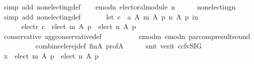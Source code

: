 \begin{isabellebody}
\ {\isacharparenleft}{\kern0pt}simp\ add{\isacharcolon}{\kern0pt}\ non{\isacharunderscore}{\kern0pt}electing{\isacharunderscore}{\kern0pt}def{\isacharparenright}{\kern0pt}\isanewline
\ \ \isamarkupfalse%
\ emod{\isacharunderscore}{\kern0pt}n{\isacharcolon}{\kern0pt}\ {\isachardoublequoteopen}electoral{\isacharunderscore}{\kern0pt}module\ n{\isachardoublequoteclose}\isanewline
\ \ \ \ \isamarkupfalse%
\ non{\isacharunderscore}{\kern0pt}electing{\isacharunderscore}{\kern0pt}n\isanewline
\ \ \ \ \isamarkupfalse%
\ {\isacharparenleft}{\kern0pt}simp\ add{\isacharcolon}{\kern0pt}\ non{\isacharunderscore}{\kern0pt}electing{\isacharunderscore}{\kern0pt}def{\isacharparenright}{\kern0pt}\isanewline
\ \ \isamarkupfalse%
\isanewline
\ \ \ \ {\isachardoublequoteopen}let\ c\ {\isacharequal}{\kern0pt}\ {\isacharparenleft}{\kern0pt}a\ A\ {\isacharparenleft}{\kern0pt}m\ A\ p{\isacharparenright}{\kern0pt}\ {\isacharparenleft}{\kern0pt}n\ A\ p{\isacharparenright}{\kern0pt}{\isacharparenright}{\kern0pt}\ in\isanewline
\ \ \ \ \ \ {\isacharparenleft}{\kern0pt}elect{\isacharunderscore}{\kern0pt}r\ c\ {\isasymsubseteq}\ {\isacharparenleft}{\kern0pt}{\isacharparenleft}{\kern0pt}elect\ m\ A\ p{\isacharparenright}{\kern0pt}\ {\isasymunion}\ {\isacharparenleft}{\kern0pt}elect\ n\ A\ p{\isacharparenright}{\kern0pt}{\isacharparenright}{\kern0pt}{\isacharparenright}{\kern0pt}{\isachardoublequoteclose}\isanewline
\ \ \ \ \isamarkupfalse%
\ conservative\ agg{\isacharunderscore}{\kern0pt}conservative{\isacharunderscore}{\kern0pt}def\isanewline
\ \ \ \ \ \ \ \ \ \ emod{\isacharunderscore}{\kern0pt}m\ emod{\isacharunderscore}{\kern0pt}n\ par{\isacharunderscore}{\kern0pt}comp{\isacharunderscore}{\kern0pt}result{\isacharunderscore}{\kern0pt}sound\isanewline
\ \ \ \ \ \ \ \ \ \ combine{\isacharunderscore}{\kern0pt}ele{\isacharunderscore}{\kern0pt}rej{\isacharunderscore}{\kern0pt}def\ fin{\isacharunderscore}{\kern0pt}A\ prof{\isacharunderscore}{\kern0pt}A\isanewline
\ \ \ \ \isamarkupfalse%
\ {\isacharparenleft}{\kern0pt}smt\ {\isacharparenleft}{\kern0pt}verit{\isacharcomma}{\kern0pt}\ ccfv{\isacharunderscore}{\kern0pt}SIG{\isacharparenright}{\kern0pt}{\isacharparenright}{\kern0pt}\isanewline
\ \ \isamarkupfalse%
\ {\isachardoublequoteopen}x\ {\isasymin}\ {\isacharparenleft}{\kern0pt}{\isacharparenleft}{\kern0pt}elect\ m\ A\ p{\isacharparenright}{\kern0pt}\ {\isasymunion}\ {\isacharparenleft}{\kern0pt}elect\ n\ A\ p{\isacharparenright}{\kern0pt}{\isacharparenright}{\kern0pt}{\isachardoublequoteclose}\isanewline

\end{isabellebody}
